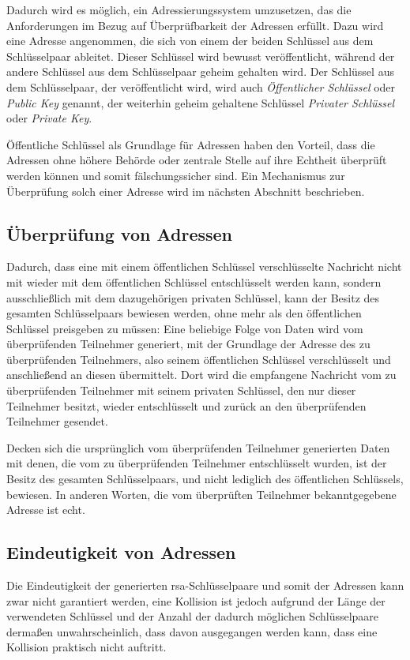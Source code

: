 Dadurch wird es möglich, ein Adressierungssystem umzusetzen, das die Anforderungen im Bezug auf
Überprüfbarkeit der Adressen erfüllt. Dazu wird eine Adresse angenommen, die sich von einem der
beiden Schlüssel aus dem Schlüsselpaar ableitet. Dieser Schlüssel wird bewusst veröffentlicht,
während der andere Schlüssel aus dem Schlüsselpaar geheim gehalten wird.
Der Schlüssel aus dem Schlüsselpaar, der veröffentlicht wird, wird auch \emph{Öffentlicher Schlüssel}
oder \emph{Public Key} genannt, der weiterhin geheim gehaltene Schlüssel \emph{Privater Schlüssel} oder
\emph{Private Key}.

Öffentliche Schlüssel als Grundlage für Adressen haben den Vorteil, dass die Adressen ohne höhere
Behörde oder zentrale Stelle auf ihre Echtheit überprüft werden können und somit fälschungssicher sind.
Ein Mechanismus zur Überprüfung solch einer Adresse wird im nächsten Abschnitt beschrieben.

\subsection{Überprüfung von Adressen}
\label{dcl-addr-proving}
Dadurch, dass eine mit einem öffentlichen Schlüssel verschlüsselte Nachricht nicht mit wieder mit dem
öffentlichen Schlüssel entschlüsselt werden kann, sondern ausschließlich mit dem dazugehörigen privaten
Schlüssel, kann der Besitz des gesamten Schlüsselpaars bewiesen werden, ohne mehr als den öffentlichen
Schlüssel preisgeben zu müssen: Eine beliebige Folge von Daten wird vom überprüfenden Teilnehmer
generiert, mit der Grundlage der Adresse des zu überprüfenden Teilnehmers, also seinem öffentlichen
Schlüssel verschlüsselt und anschließend an diesen übermittelt. Dort wird die empfangene Nachricht vom zu
überprüfenden Teilnehmer mit seinem privaten Schlüssel, den nur dieser Teilnehmer besitzt, wieder
entschlüsselt und zurück an den überprüfenden Teilnehmer gesendet.

Decken sich die ursprünglich vom überprüfenden Teilnehmer generierten Daten mit denen, die vom zu
überprüfenden Teilnehmer entschlüsselt wurden, ist der Besitz des gesamten Schlüsselpaars, und nicht
lediglich des öffentlichen Schlüssels, bewiesen. In anderen Worten, die vom überprüften Teilnehmer
bekanntgegebene Adresse ist echt.



\subsection{Eindeutigkeit von Adressen}
\label{dcl-addr-uniqueness}
Die Eindeutigkeit der generierten \gls{rsa}-Schlüsselpaare und somit der Adressen kann zwar nicht
garantiert werden, eine Kollision ist jedoch aufgrund der Länge der verwendeten Schlüssel und der
Anzahl der dadurch möglichen Schlüsselpaare dermaßen unwahrscheinlich, dass davon ausgegangen
werden kann, dass eine Kollision praktisch nicht auftritt. \cite{crypto.stackexchange.com/a/2559:rsa-key-collision}

